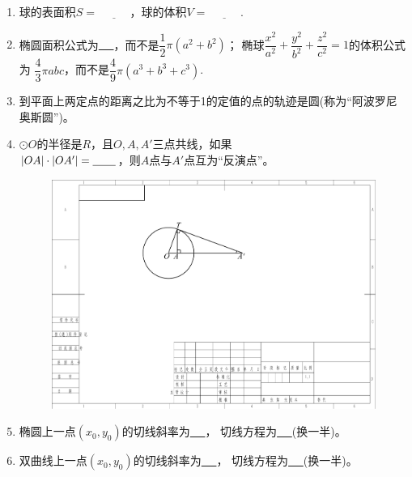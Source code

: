 \documentclass{article}
\newif\ifte
\begin{document}
\begin{multicols}{2}
\begin{enumerate}[leftmargin=20pt]
\item 球的表面积$ S=\underline{\ \ifte 4\pi R^2
    \else \hspace{1cm} \fi\ } $，球的体积$ V=\underline{\ 
    \ifte \dfrac{4}{3}\pi R^3\else \hspace{1cm} \fi\ } $.

\item 椭圆面积公式为\underline{\ \ifte $ \pi ab $
    \else \hspace{1cm} \fi\ }，而不是$ \dfrac{1}{2}\pi(a^2+b^2) $；
椭球$ \dfrac{x^2}{a^2}+\dfrac{y^2}{b^2}+\dfrac{z^2}{c^2}=1 $的体积公式为
$ \dfrac{4}{3}\pi abc $，而不是$ \dfrac{4}{9}\pi (a^3+b^3+c^3) $.

\item 到平面上两定点的距离之比为不等于1的定值的点的轨迹是圆(称为“阿波罗尼奥斯圆”)。

\item $ \odot O $的半径是$ R $，且$ O,A,A' $三点共线，如果 \\ 
$ |OA|\cdot |OA'|=\underline{\ \ifte R^2\else 
 \hspace{0.5cm} \fi\ } $，则$ A $点与$ A' $点互为“反演点”。
\begin{figure}[H]
    \centering
    \includegraphics[width=0.5\linewidth]{圆的反演点}
\end{figure}

\item 椭圆上一点$ (x_0,y_0) $的切线斜率为\underline{\ \ifte 
    $ -\dfrac{b^2x_0}{a^2y_0} $\else \hspace{1cm} \fi\ }，
切线方程为\underline{\ \ifte $ \dfrac{xx_0}{a^2}+\dfrac{yy_0}{b^2}=1 $
    \else \hspace{2cm} \fi\ }(换一半)。

\item 双曲线上一点$ (x_0,y_0) $的切线斜率为\underline{\ \ifte
    $ \dfrac{b^2x_0}{a^2y_0} $  \else \hspace{1cm} \fi\ }，
切线方程为\underline{\ \ifte $ \dfrac{xx_0}{a^2}-
    \dfrac{yy_0}{b^2}=1 $\else \hspace{2cm} \fi\ }(换一半)。


\end{enumerate}
\end{multicols}
\end{document}
